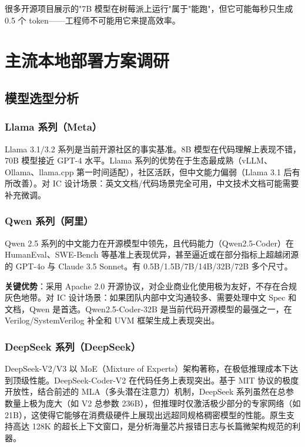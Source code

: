 \documentclass[UTF8,a4paper,10pt,oneside]{ctexart}
\begin{document}
很多开源项目展示的"7B 模型在树莓派上运行"属于"能跑"，但它可能每秒只生成 0.5 个 token——工程师不可能用它来提高效率。

\section{主流本地部署方案调研}

\subsection{模型选型分析}

\subsubsection{Llama 系列（Meta）}

Llama 3.1/3.2 系列是当前开源社区的事实基准。8B 模型在代码理解上表现不错，70B 模型接近 GPT-4 水平。Llama 系列的优势在于生态最成熟（vLLM、Ollama、llama.cpp 第一时间适配），社区活跃，但中文能力偏弱（Llama 3.1 后有所改善）。对 IC 设计场景：英文文档/代码场景完全可用，中文技术文档可能需要补充微调。

\subsubsection{Qwen 系列（阿里）}

Qwen 2.5 系列的中文能力在开源模型中领先，且代码能力（Qwen2.5-Coder）在 HumanEval、SWE-Bench 等基准上表现优异，甚至逼近或在部分指标上超越闭源的 GPT-4o 与 Claude 3.5 Sonnet。有 0.5B/1.5B/7B/14B/32B/72B 多个尺寸。

\textbf{关键优势}：采用 Apache 2.0 开源协议，对企业商业化使用极为友好，不存在合规灰色地带。对 IC 设计场景：如果团队内部中文沟通较多、需要处理中文 Spec 和文档，Qwen 是首选。Qwen2.5-Coder-32B 是当前代码开源模型的最强之一，在 Verilog/SystemVerilog 补全和 UVM 框架生成上表现突出。

\subsubsection{DeepSeek 系列（DeepSeek）}

DeepSeek-V2/V3 以 MoE（Mixture of Experts）架构著称，在极低推理成本下达到顶级性能。DeepSeek-Coder-V2 在代码任务上表现突出。基于 MIT 协议的极度开放性，结合前述的 MLA（多头潜在注意力）机制，DeepSeek 系列虽然在总参数量上极为庞大（如 V2 总参数 236B），但推理时仅激活极少部分的专家网络（如 21B），这使得它能够在消费级硬件上展现出远超同规格稠密模型的性能。原生支持高达 128K 的超长上下文窗口，是分析海量芯片报错日志与长篇微架构规范的利器。
\end{document}
